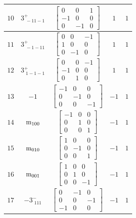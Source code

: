 \documentclass[fleqn,8pt]{jsarticle}
\begin{document}
\begin{longtable}{ccccc}
$ 10 $ & $ 3^{+}_{\,\,-11-1} $ & $ \begin{bmatrix} 0 & 0 & 1 \\ -1 & 0 & 0 \\ 0 & -1 & 0 \end{bmatrix} $ & $ 1 $ & $ 1 $ \\ \hline
$ 11 $ & $ 3^{+}_{\,\,-1-11} $ & $ \begin{bmatrix} 0 & 0 & -1 \\ 1 & 0 & 0 \\ 0 & -1 & 0 \end{bmatrix} $ & $ 1 $ & $ 1 $ \\ \hline
$ 12 $ & $ 3^{+}_{\,\,1-1-1} $ & $ \begin{bmatrix} 0 & 0 & -1 \\ -1 & 0 & 0 \\ 0 & 1 & 0 \end{bmatrix} $ & $ 1 $ & $ 1 $ \\ \hline
$ 13 $ & $ -1 $ & $ \begin{bmatrix} -1 & 0 & 0 \\ 0 & -1 & 0 \\ 0 & 0 & -1 \end{bmatrix} $ & $ -1 $ & $ 1 $ \\ \hline
$ 14 $ & $ {\rm m}_{100} $ & $ \begin{bmatrix} -1 & 0 & 0 \\ 0 & 1 & 0 \\ 0 & 0 & 1 \end{bmatrix} $ & $ -1 $ & $ 1 $ \\ \hline
$ 15 $ & $ {\rm m}_{010} $ & $ \begin{bmatrix} 1 & 0 & 0 \\ 0 & -1 & 0 \\ 0 & 0 & 1 \end{bmatrix} $ & $ -1 $ & $ 1 $ \\ \hline
$ 16 $ & $ {\rm m}_{001} $ & $ \begin{bmatrix} 1 & 0 & 0 \\ 0 & 1 & 0 \\ 0 & 0 & -1 \end{bmatrix} $ & $ -1 $ & $ 1 $ \\ \hline
$ 17 $ & $ -3^{-}_{\,\,111} $ & $ \begin{bmatrix} 0 & -1 & 0 \\ 0 & 0 & -1 \\ -1 & 0 & 0 \end{bmatrix} $ & $ -1 $ & $ 1 $ \\ \hline

\end{longtable}
\end{document}
